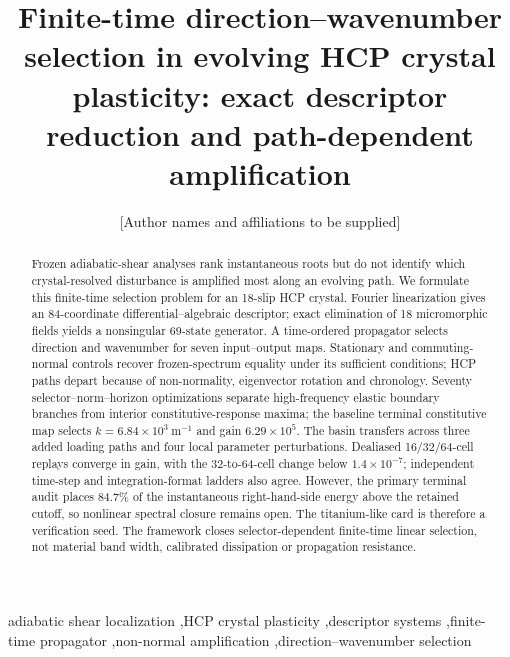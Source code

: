 \documentclass[preprint,12pt]{elsarticle}
\begin{document}
\begin{frontmatter}

\title{Finite-time direction--wavenumber selection in evolving HCP crystal plasticity: exact descriptor reduction and path-dependent amplification}

\author{[Author names and affiliations to be supplied]}

\begin{abstract}
Frozen adiabatic-shear analyses rank instantaneous roots but do not identify
which crystal-resolved disturbance is amplified most along an evolving path.
We formulate this finite-time selection problem for an 18-slip HCP crystal.
Fourier linearization gives an 84-coordinate differential--algebraic
descriptor; exact elimination of 18 micromorphic fields yields a nonsingular
69-state generator.  A time-ordered propagator selects direction and
wavenumber for seven input--output maps.  Stationary and commuting-normal
controls recover frozen-spectrum equality under its sufficient conditions;
HCP paths depart because of non-normality, eigenvector rotation and chronology.
Seventy selector--norm--horizon optimizations separate high-frequency elastic
boundary branches from interior constitutive-response maxima; the baseline
terminal constitutive map selects $k=6.84\times10^3~\mathrm{m^{-1}}$ and gain
$6.29\times10^5$.  The basin transfers across three added loading paths and
four local parameter perturbations.  Dealiased 16/32/64-cell replays converge
in gain, with the 32-to-64-cell change below $1.4\times10^{-7}$; independent
time-step and integration-format ladders also agree.  However, the primary
terminal audit places 84.7\% of the instantaneous right-hand-side energy
above the retained cutoff, so nonlinear spectral closure remains open.  The
titanium-like card is therefore a verification seed.  The framework closes
selector-dependent finite-time linear selection, not material band width,
calibrated dissipation or propagation resistance.
\end{abstract}

\begin{keyword}
adiabatic shear localization \sep HCP crystal plasticity \sep descriptor systems \sep finite-time propagator \sep non-normal amplification \sep direction--wavenumber selection
\end{keyword}

\end{frontmatter}




\end{document}
